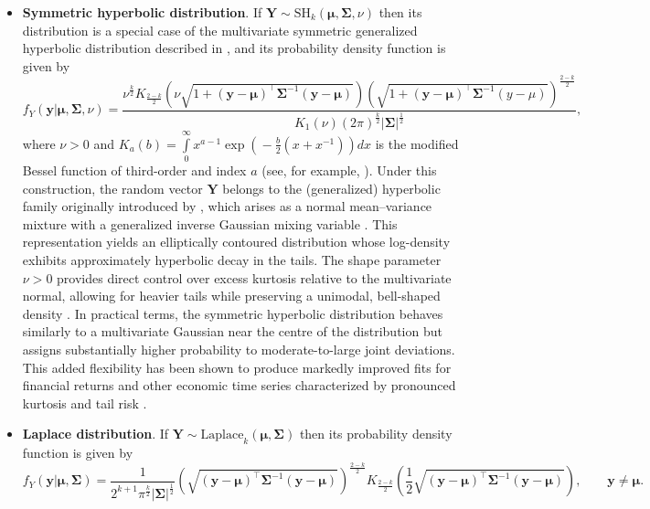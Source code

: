 \begin{itemize}
\item {\bf Symmetric hyperbolic distribution}. If $\bm{Y}\sim\text{SH}_k(\bm{\mu},\bm{\Sigma},\nu)$ then its distribution is a special case of the multivariate symmetric generalized hyperbolic distribution described in \citet[example 6.8]{MFE05}, and its probability density function is given by 
\begin{equation*}
f_{Y}(\bm{y}|\bm{\mu},\bm{\Sigma},\nu)=\dfrac{\nu^{\frac{k}{2}} K_{\frac{2-k}{2}}\!\!\left(\!\nu\sqrt{1 + (\bm{y}-\bm{\mu})^{\!\top}\bm{\Sigma}^{-1}(\bm{y}-\bm{\mu})}\right) \left(\!\!\sqrt{1+(\bm{y}-\bm{\mu})^{\!\top}\bm{\Sigma}^{-1}(y-\mu)}\right)^{\!\!\frac{2-k}{2}}}{K_{1}(\nu)(2\pi)^{\frac{k}{2}}|\bm{\Sigma}|^{\frac{1}{2}}},
\end{equation*}
where $\nu>0$ and $K_{a}(b)=\int\limits_{0}^{\infty}x^{a-1}\exp\!\!\left(\!-\frac{b}{2}(x+x^{-1})\!\right)d x$ is the modified
Bessel function of third-order and index $a$ (see, for example, \citet[section 9.6]{AS65}). Under this construction, the random vector $\bm{Y}$ belongs to the (generalized) hyperbolic family originally introduced by \citet{BarndorffNielsen1977}, which arises as a normal mean–variance mixture with a generalized inverse Gaussian mixing variable \citep[Chapter~6]{MFE05}. This representation yields an elliptically contoured distribution whose log-density exhibits approximately hyperbolic decay in the tails. The shape parameter $\nu>0$ provides direct control over excess kurtosis relative to the multivariate normal, allowing for heavier tails while preserving a unimodal, bell-shaped density \citep{BarndorffNielsen1977,BarndorffNielsenBlaesild1983}. In practical terms, the symmetric hyperbolic distribution behaves similarly to a multivariate Gaussian near the centre of the distribution but assigns substantially higher probability to moderate-to-large joint deviations. This added flexibility has been shown to produce markedly improved fits for financial returns and other economic time series characterized by pronounced kurtosis and tail risk \citep{EberleinKeller1995,BibbySorensen2003}.

\item {\bf Laplace distribution}. If $\bm{Y}\sim\text{Laplace}_k(\bm{\mu},\bm{\Sigma})$ then its probability density function is given by \citep[page 234]{KKP01}
\begin{equation*}
f_{Y}(\bm{y}|\bm{\mu},\bm{\Sigma})=\dfrac{1}{2^{k+1}\pi^{\frac{k}{2}}|\bm{\Sigma}|^{\frac{1}{2}}}\!
\left(\!\sqrt{(\bm{y}-\bm{\mu})^{\!\top}\bm{\Sigma}^{-1}(\bm{y}-\bm{\mu})}\right)^{\!\!\frac{2-k}{2}}\!
K_{\frac{2-k}{2}}\!\!\left(\!\frac{1}{2}\sqrt{(\bm{y}-\bm{\mu})^{\!\top}\bm{\Sigma}^{-1}(\bm{y}-\bm{\mu})}\right),\qquad \bm{y}\neq \bm{\mu}.
\end{equation*}


\end{itemize}
